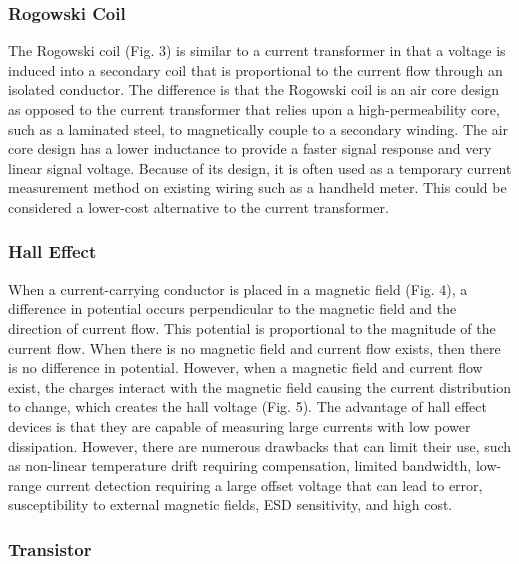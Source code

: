 \documentclass[12pt,a4paper,titlepage,openany]{report}
\begin{document}
\subsubsection{Rogowski Coil}
The Rogowski coil (Fig. 3) is similar to a current transformer in that a voltage is induced into a secondary coil that is proportional
to the current flow through an isolated conductor. The difference is that the Rogowski coil is an air core design as opposed to
the current transformer that relies upon a high-permeability core, such as a laminated steel, to magnetically couple to a
secondary winding. The air core design has a lower inductance to provide a faster signal response and very linear signal voltage.
Because of its design, it is often used as a temporary current measurement method on existing wiring such as a handheld meter.
This could be considered a lower-cost alternative to the current transformer.

\subsubsection{Hall Effect}
When a current-carrying conductor is placed in a magnetic field (Fig. 4), a difference in potential occurs perpendicular to the
magnetic field and the direction of current flow. This potential is proportional to the magnitude of the current flow. When there
is no magnetic field and current flow exists, then there is no difference in potential. However, when a magnetic field and current
flow exist, the charges interact with the magnetic field causing the current distribution to change, which creates the hall voltage
(Fig. 5).
The advantage of hall effect devices is that they are capable of measuring large currents with low power dissipation. However,
there are numerous drawbacks that can limit their use, such as non-linear temperature drift requiring compensation, limited
bandwidth, low-range current detection requiring a large offset voltage that can lead to error, susceptibility to external magnetic
fields, ESD sensitivity, and high cost.

\subsubsection{Transistor}
\end{document}
